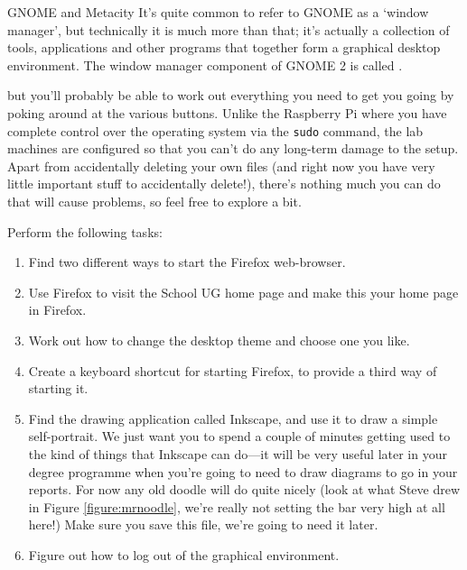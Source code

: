 \noindent{}

\begin{linux}{GNOME and Metacity}
It's quite common to refer to GNOME as a `window manager', but technically it is much more than that; it's actually a collection of tools, applications and other programs that together form a graphical desktop environment. The window manager component of GNOME 2 is called .
\end{linux} 

\noindent but you'll probably be able to work out everything you need to get you going by poking around at the various buttons. Unlike the Raspberry Pi where you have complete control over the operating system via the \texttt{sudo} command, the lab machines are configured so that you can't do any long-term damage to the setup. Apart from accidentally deleting your own files (and right now you have very little important stuff to accidentally delete!), there's nothing much you can do that will cause problems, so feel free to explore a bit. 

Perform the following tasks:
\begin{enumerate}
\item Find two different ways to start the Firefox web-browser.
\item Use Firefox to visit the School UG home page
   and make this your
  home page in Firefox.
\item Work out how to change the desktop theme and choose one you like.
\item Create a keyboard shortcut for starting Firefox, to provide a third way of starting it.
\item Find the  drawing application called Inkscape, and use it to draw a simple self-portrait. We just want you to spend a couple of minutes getting used to the kind of things that Inkscape can do---it will be very useful later in your degree programme when you're going to need to draw diagrams to go in your reports. For now any old doodle will do quite nicely (look at what Steve drew in Figure \ref{figure:mrnoodle}, we're really not setting the bar very high at all here!) Make sure you save this file, we're going to need it later.
\item Figure out how to log out of the graphical environment. \label{list:logout}
\end{enumerate}

